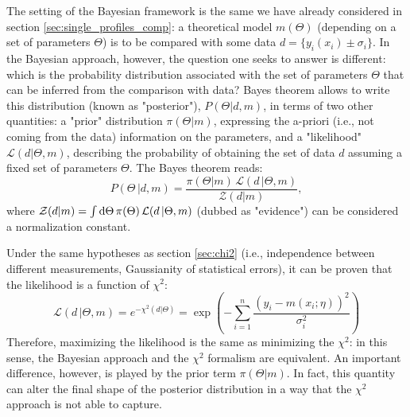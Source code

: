 The setting of the Bayesian framework is the same we have already considered in section \ref{sec:single_profiles_comp}: a theoretical model $m(\Theta)$ (depending on a set of parameters $\Theta$) is to be compared with some data $d=\{y_i(x_i)\pm \sigma_i\}$.
%
In the Bayesian approach, however, the question one seeks to answer is different: which is the probability distribution associated with the set of parameters $\Theta$ that can be inferred from the comparison with data?
%
Bayes theorem allows to write this distribution (known as "posterior"), $P(\Theta|d,m)$, in terms of two other quantities: a "prior" distribution $\pi(\Theta|m)$, expressing the a-priori (i.e., not coming from the data) information on the parameters, and a "likelihood" $\mathcal{L}(d|\Theta,m)$, describing the probability of obtaining the set of data $d$ assuming a fixed set of parameters $\Theta$. The Bayes theorem reads:
\begin{equation}
    P(\Theta\,|d,m) = \frac{\pi(\Theta|m)\,\mathcal{L}(d\,|\Theta, m)}{\mathcal{Z}(d|m)},
\end{equation}
where $\mathcal{Z}(d|m)= \int \mathrm{d} \Theta\,\pi(\Theta)\,\mathcal{L}(d\,|\Theta, m) $ (dubbed as "evidence") can be considered a normalization constant.

Under the same hypotheses as section \ref{sec:chi2} (i.e., independence between different measurements, Gaussianity of statistical errors), it can be proven \citep[e.g.,][]{jaynes_2003} that the likelihood is a function of $\chi^2$:
\begin{equation}
    \mathcal{L}(d\,|\Theta, m) = e^{-\chi^2(d|\Theta)} = \exp\left(-\sum_{i=1}^n \frac{(y_i - m(x_i;\eta))^2}{\sigma_i^2}\right)
\end{equation}
Therefore, maximizing the likelihood is the same as minimizing the $\chi^2$: in this sense, the Bayesian approach and the $\chi^2$ formalism are equivalent. An important difference, however, is played by the prior term $\pi(\Theta|m)$. In fact, this quantity can alter the final shape of the posterior distribution in a way that the $\chi^2$ approach is not able to capture. 

